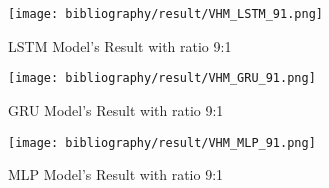 \documentclass{ieeeojies}
\begin{document}
	\begin{figure}[H]
		\centering
		\begin{minipage}{0.9\linewidth}
			\centering
			\texttt{[image: bibliography/result/VHM\_LSTM\_91.png]}
			\caption{LSTM Model's Result with ratio 9:1}
			\label{fig1.6}
		\end{minipage}
	\end{figure}
	\begin{figure}[H]
		\centering
		\begin{minipage}{0.9\linewidth}
			\centering
			\texttt{[image: bibliography/result/VHM\_GRU\_91.png]}
			\caption{GRU Model's Result with ratio 9:1}
			\label{fig1.7}
		\end{minipage}
	\end{figure}
	\begin{figure}[H]
		\centering
		\begin{minipage}{0.9\linewidth}
			\centering
			\texttt{[image: bibliography/result/VHM\_MLP\_91.png]}
			\caption{MLP Model's Result with ratio 9:1}
			\label{fig1.8}
		\end{minipage}
	\end{figure}
	
\end{document}
